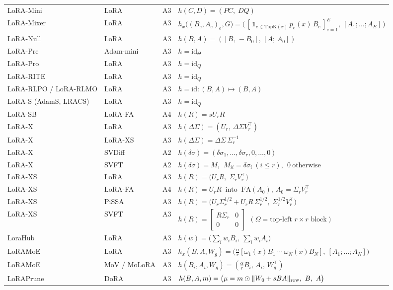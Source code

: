 \begin{longtable}{@{}>{\raggedright\arraybackslash}p{2.4cm}>{\raggedright\arraybackslash}p{2.4cm}c>{\raggedright\arraybackslash}p{8.6cm}@{}}
LoRA-Mini & LoRA & A3 & $h(C,D)=(PC,\;DQ)$\\
LoRA-Mixer & LoRA & A3 & $h_x\big((B_e,A_e)_e,G\big)=\big(\,[\,\mathbb 1_{e\in\mathrm{TopK}(x)}\,p_e(x)\,B_e\,]_{e=1}^{E},\ [A_1;\dots;A_E]\,\big)$\\
LoRA-Null & LoRA & A3 & $h(B,A)=([B,\,-B_0],\,[A;\,A_0])$\\
LoRA-Pre & Adam-mini & A3 & $h=\mathrm{id}_\Theta$\\
LoRA-Pro & LoRA & A3 & $h=\mathrm{id}_Q$\\
LoRA-RITE & LoRA & A3 & $h=\mathrm{id}_Q$\\
LoRA-RLPO / LoRA-RLMO & LoRA & A3 & $h=\mathrm{id}:(B,A)\mapsto(B,A)$\\
LoRA-S (AdamS, LRACS) & LoRA & A3 & $h=\mathrm{id}_Q$\\
LoRA-SB & LoRA-FA & A4 & $h(R)=sU_rR$\\
LoRA-X & LoRA & A3 & $h(\Delta\Sigma)=(U_r,\ \Delta\Sigma V_r^\top)$\\
LoRA-X & LoRA-XS & A3 & $h(\Delta\Sigma)=\Delta\Sigma\,\Sigma_r^{-1}$\\
LoRA-X & SVDiff & A2 & $h(\delta\sigma)=(\delta\sigma_1,\dots,\delta\sigma_r,0,\dots,0)$\\
LoRA-X & SVFT & A2 & $h(\delta\sigma)=M,\ \ M_{ii}=\delta\sigma_i\ (i\le r),\ \ 0\ \text{otherwise}$\\
LoRA-XS & LoRA & A3 & $h(R)=\big(U_rR,\;\Sigma_rV_r^\top\big)$\\
LoRA-XS & LoRA-FA & A4 & $h(R)=U_rR\ \text{ into }\ \mathrm{FA}(A_0),\ A_0=\Sigma_rV_r^\top$\\
LoRA-XS & PiSSA & A3 & $h(R)=\big(U_r\Sigma_r^{1/2}+U_rR\,\Sigma_r^{1/2},\;\Sigma_r^{1/2}V_r^\top\big)$\\
LoRA-XS & SVFT & A3 & $h(R)=\begin{bmatrix}R\Sigma_r&0\\0&0\end{bmatrix}\ \ (\Omega=\text{top-left }r\times r\text{ block})$\\
LoraHub & LoRA & A3 & $h(w)=\big(\textstyle\sum_iw_iB_i,\ \sum_iw_iA_i\big)$\\
LoRAMoE & LoRA & A3 & $h_x(B,A,W_g)=\big(\tfrac\alpha r[\omega_1(x)B_1\ \cdots\ \omega_N(x)B_N],\ [A_1;\dots;A_N]\big)$\\
LoRAMoE & MoV / MoLoRA & A3 & $h(B_i,A_i,W_g)=(\tfrac\alpha rB_i,\,A_i,\,W_g^\top)$\\
LoRAPrune & DoRA & A3 & $h(B,A,m)=\big(\mu=m\odot\lVert W_0+sBA\rVert_{\rm row},\ B,\ A\big)$\\

\end{longtable}
